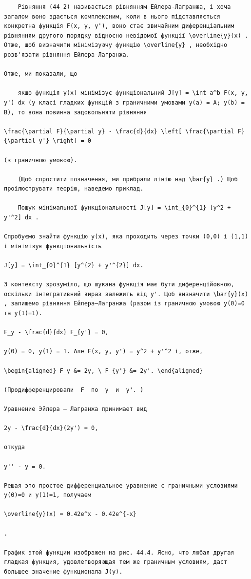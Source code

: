 \documentclass[
  ukrainian,
]{article}
\begin{document}
\begin{verbatim}
    Рівняння (44 2) називається рівнянням Ейлера-Лагранжа, і хоча загалом воно здається комплексним, коли в нього підставляється конкретна функція F(x, y, y'), воно стає звичайним диференціальним рівнянням другого порядку відносно невідомої функції \overline{y}(x) . Отже, щоб визначити мінімізуючу функцію \overline{y} , необхідно розв'язати рівняння Ейлера-Лагранжа.

Отже, ми показали, що

    якщо функція y(x) мінімізує функціональний J[y] = \int_a^b F(x, y, y') dx (у класі гладких функцій з граничними умовами y(a) = A; y(b) = B), то вона повинна задовольняти рівняння

\frac{\partial F}{\partial y} - \frac{d}{dx} \left[ \frac{\partial F}{\partial y'} \right] = 0

(з граничною умовою).

    (Щоб спростити позначення, ми прибрали лінію над \bar{y} .) Щоб проілюструвати теорію, наведемо приклад.

    Пошук мінімальної функціональності J[y] = \int_{0}^{1} [y^2 + y'^2] dx .

Спробуємо знайти функцію y(x), яка проходить через точки (0,0) і (1,1) і мінімізує функціональність

J[y] = \int_{0}^{1} [y^{2} + y'^{2}] dx.

З контексту зрозуміло, що шукана функція має бути диференційовною, оскільки інтегративний вираз залежить від y'. Щоб визначити \bar{y}(x) , запишемо рівняння Ейлера–Лагранжа (разом із граничною умовою y(0)=0 та y(1)=1).

F_y - \frac{d}{dx} F_{y'} = 0,

y(0) = 0, y(1) = 1. Але F(x, y, y') = y^2 + y'^2 і, отже,

\begin{aligned} F_y &= 2y, \ F_{y'} &= 2y'. \end{aligned}

(Продифференцировали  F  по  y  и  y'. )

Уравнение Эйлера — Лагранжа принимает вид

2y - \frac{d}{dx}(2y') = 0,

откуда

y'' - y = 0.

Решая это простое дифференциальное уравнение с граничными условиями y(0)=0 и y(1)=1, получаем

\overline{y}(x) = 0.42e^x - 0.42e^{-x}

.

График этой функции изображен на рис. 44.4. Ясно, что любая другая гладкая функция, удовлетворяющая тем же граничным условиям, даст большее значение функционала J(y).


\end{verbatim}
\end{document}
